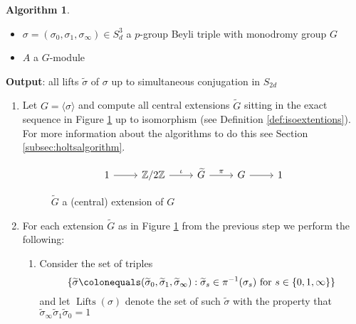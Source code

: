 \documentclass{dcthesis}
\newcommand{\ZZ}{\mathbb Z}
\newcommand{\wt}[1]{\widetilde{#1}}
\DeclareMathOperator{\Lifts}{Lifts}
\theoremstyle{definition}
\newtheorem{alg}[prop]{Algorithm}
\theoremstyle{remark}
\numberwithin{equation}{section}
\numberwithin{figure}{section}
\begin{document}
{{\begin{alg}
\begin{itemize}
        \item 
          $\sigma=(\sigma_0,\sigma_1,\sigma_\infty)\in S_d^3$ a $p$-group Beyli triple
          with monodromy group $G$
        \item
          $A$ a $G$-module
      \end{itemize}
      \textbf{Output}: all lifts $\wt{\sigma}$
      of $\sigma$ up to simultaneous conjugation in $S_{2d}$
      \begin{enumerate}
        \item
          Let $G = \langle\sigma\rangle$
          and compute all central extensions $\wt{G}$
          sitting in the exact sequence in Figure \ref{fig:centralext}
          up to isomorphism (see Definition \ref{def:isoextentions}).
          For more information about the algorithms to do this
          see Section \ref{subsec:holtsalgorithm}.
          \begin{figure}[ht]
            \[
              \begin{tikzcd}[ampersand replacement=\&, row sep = small]
                1\arrow{r}\&\ZZ/2\ZZ\arrow{r}{\iota}\&\wt{G}\arrow{r}{\pi}\&G\arrow{r}\&1
              \end{tikzcd}
            \]
            \caption{$\wt{G}$ a (central) extension of $G$}
            \label{fig:centralext}
          \end{figure}
        \item
          For each extension $\wt{G}$ as in Figure \ref{fig:centralext}
          from the previous step
          we perform the following:
          \begin{enumerate}
            \item
              Consider the set of triples
              \begin{equation}
                \label{eqn:lifts}
                \{
                  \wt{\sigma}\colonequals(\wt{\sigma}_0, \wt{\sigma}_1, \wt{\sigma}_\infty) :
                  \wt{\sigma}_s\in\pi^{-1}(\sigma_s)\text{ for }
                  s\in\{0,1,\infty\}
                \}
              \end{equation}
              and let $\Lifts(\sigma)$ denote the set of such $\wt{\sigma}$
              with the property that $\wt{\sigma}_\infty\wt{\sigma}_1\wt{\sigma}_0 = 1$

\end{enumerate}
\end{enumerate}
\end{alg}}}
\end{document}
